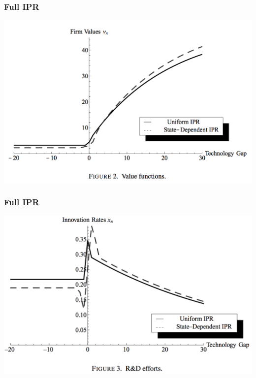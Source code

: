 \documentclass{beamer}
\begin{document}
\begin{frame}[t]\frametitle{Full IPR} 
  \begin{center}
    \includegraphics[scale=.31]{full_ipr_value.png}
    \label{fig:full_ipr_value}
  \end{center}
\end{frame}

\begin{frame}[t]\frametitle{Full IPR} 
  \begin{center}
    \includegraphics[scale=.28]{full_ipr_rnd.png}
    \label{fig:full_ipr_rnd}
  \end{center}
\end{frame}
\end{document}
